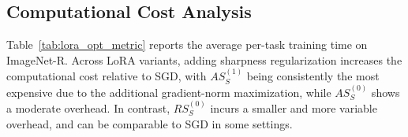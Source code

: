 \documentclass{article}
\theoremstyle{plain}
\theoremstyle{definition}
\theoremstyle{remark}
\begin{document}
\subsection{Computational Cost Analysis}


Table~\ref{tab:lora_opt_metric} reports the average per-task training time on ImageNet-R.
Across LoRA variants, adding sharpness regularization increases the computational cost relative to SGD, with $AS^{(1)}_S$ being consistently the most expensive due to the additional gradient-norm maximization, while $AS^{(0)}_S$ shows a moderate overhead.
In contrast, $RS^{(0)}_S$ incurs a smaller and more variable overhead, and can be comparable to SGD in some settings.
\end{document}
